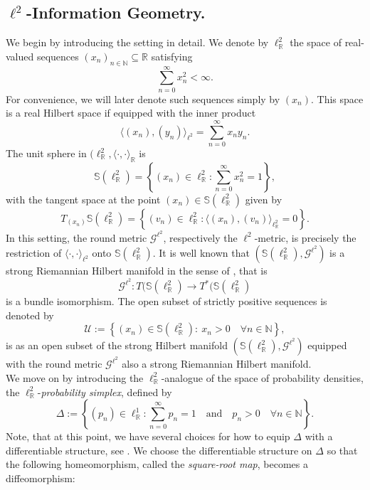 \documentclass[12pt]{amsart}
\numberwithin{figure}{section}
\numberwithin{table}{section}
\numberwithin{equation}{section}
\def\NN{\mathbb{N}}
\def\RR{\mathbb{R}}
\def\Slr{\mathbb{S}\left(\ell_{\RR}^2 \right)}
\def\U{\mathcal{U}}
\def\Glt{\mathcal{G}^{\ell^2}}
\begin{document}
\subsection{$\ell^2$-Information Geometry.}\label{ss:ell_2_info_geo} We begin by introducing the setting in detail. We denote by $
\ell^2_\mathbb{R}$ the space of real-valued sequences $(x_n)_{n\in \mathbb{N}} \subseteq \mathbb{R}$ satisfying $$\sum_{n=0}^{\infty} x_n^2 < \infty.$$
For convenience, we will later denote such sequences simply by $(x_n)$. This space is a real Hilbert space if equipped  with the inner product \[
\langle (x_n), (y_n)\rangle_{\ell^2} = \sum_{n=0}^{\infty} x_n y_n.\]
The unit sphere in $(\ell^2_{\mathbb{R}},\langle \cdot,\cdot \rangle_\RR$ is 
\[
\mathbb{S}\left(\ell^2_{\mathbb{R}} \right)=\left\{(x_n)\in \ell_{\mathbb{R}}^2 : \sum_{n=0}^{\infty} x_n^2 = 1 \right\},
\]
with the tangent space at the point $(x_n) \in \mathbb{S}(\ell^2_{\mathbb{R}})$ given by
\[
T_{(x_n)} \mathbb{S}(\ell^2_{\mathbb{R}}) = \left\{(v_n) \in \ell_{\mathbb{R}}^2 : \langle (x_n), (v_n) \rangle_{\ell^2_{\mathbb{R}}} = 0 \right\}.
\]
In this setting, the round metric $\Glt$, respectively the $\ell^2$-metric, is precisely the restriction of $\langle\cdot, \cdot \rangle_{\ell^2}$ onto $\mathbb{S}(\ell^2_{\mathbb{R}})$. It is well known that \( (\mathbb{S}(\ell^2_{\mathbb{R}}), \Glt) \) is a strong Riemannian Hilbert manifold in the sense of \cite{La99}, that is \[\Glt:T(\mathbb{S}(\ell^2_{\mathbb{R}})\longrightarrow T^*(\mathbb{S}(\ell^2_{\mathbb{R}})\] is a bundle isomorphism.
The open subset of strictly positive sequences is denoted by 
\begin{equation}\label{e: definition Ul2 }
	\U:=\left\{(x_n)\in \Slr:\  x_n>0 \quad \forall n\in \NN\right\},
\end{equation}
is as an open subset of the strong Hilbert manifold $(\mathbb{S}(\ell^2_{\mathbb{R}}), \Glt)$ equipped with the round metric $\Glt$ also a strong Riemannian Hilbert manifold.\\ 
We move on by introducing the $\ell^2_{\mathbb{R}}$-analogue of the space of probability densities, the $\ell^2_{\mathbb{R}}$-\emph{probability simplex}, defined by 
\begin{equation}\label{e: definition l2probability simplex}
	\Delta := \left\{(p_n) \in \ell^1_{\mathbb{R}} : \sum_{n=0}^{\infty} p_n = 1 \quad \text{and} \quad p_n > 0 \quad \forall n \in \mathbb{N} \right\}.
\end{equation}
Note, that at this point, we have several choices for how to equip $\Delta$ with a differentiable structure, see . We choose the differentiable structure on $\Delta$ so that the following homeomorphism, called the \emph{square-root map}, becomes a diffeomorphism:
\end{document}
